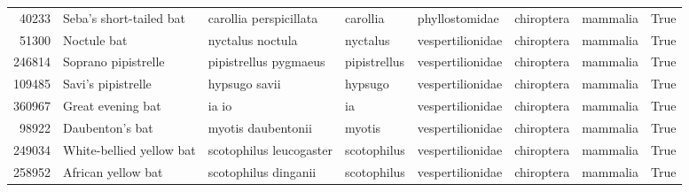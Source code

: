 \begin{tabular}{rllllllr}
40233 & Seba's short-tailed bat & carollia perspicillata & carollia & phyllostomidae & chiroptera & mammalia & True \\
51300 & Noctule bat & nyctalus noctula & nyctalus & vespertilionidae & chiroptera & mammalia & True \\
246814 & Soprano pipistrelle & pipistrellus pygmaeus & pipistrellus & vespertilionidae & chiroptera & mammalia & True \\
109485 & Savi's pipistrelle & hypsugo savii & hypsugo & vespertilionidae & chiroptera & mammalia & True \\
360967 & Great evening bat & ia io & ia & vespertilionidae & chiroptera & mammalia & True \\
98922 & Daubenton's bat & myotis daubentonii & myotis & vespertilionidae & chiroptera & mammalia & True \\
249034 & White-bellied yellow bat & scotophilus leucogaster & scotophilus & vespertilionidae & chiroptera & mammalia & True \\
258952 & African yellow bat & scotophilus dinganii & scotophilus & vespertilionidae & chiroptera & mammalia & True \\
\bottomrule
\end{tabular}
